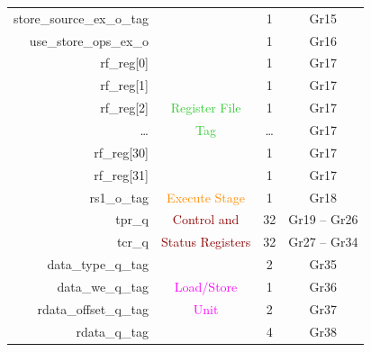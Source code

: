 \begin{table}[t]
\begin{tabular}{@{}rccc@{}}
        store\_source\_ex\_o\_tag       &                                       & 1      & Gr15                        \\
        use\_store\_ops\_ex\_o          &                                       & 1      & Gr16                        \\\hdashline
        rf\_reg[0]                      &                                       & 1      & Gr17                        \\
        rf\_reg[1]                      &                                       & 1      & Gr17                        \\
        rf\_reg[2]                      & \textcolor{LimeGreen}{Register File}  & 1      & Gr17                        \\
        \ldots                          & \textcolor{LimeGreen}{Tag}            & \ldots & Gr17                        \\
        rf\_reg[30]                     &                                       & 1      & Gr17                        \\
        rf\_reg[31]                     &                                       & 1      & Gr17                        \\\hdashline
        rs1\_o\_tag                     & \textcolor{DarkOrange}{Execute Stage} & 1      & Gr18                        \\\hdashline
        tpr\_q                          & \textcolor{DarkRed}{Control and}      & 32     & Gr19 -- Gr26                 \\
        tcr\_q                          & \textcolor{DarkRed}{Status Registers} & 32     & Gr27 -- Gr34                 \\\hdashline
        data\_type\_q\_tag              &                                       & 2      & Gr35                        \\
        data\_we\_q\_tag                & \textcolor{magenta}{Load/Store}       & 1      & Gr36                        \\
        rdata\_offset\_q\_tag           & \textcolor{magenta}{Unit}             & 2      & Gr37                        \\
        rdata\_q\_tag                   &                                       & 4      & Gr38                        \\
        \bottomrule
    \end{tabular}
\end{table}

